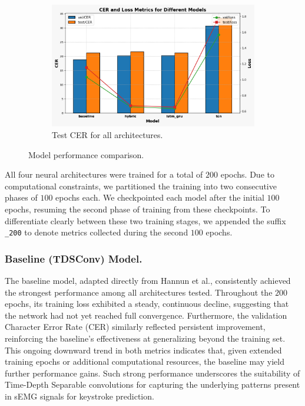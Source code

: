 \begin{figure}
\begin{subfigure}[b]{0.3\textwidth}
        \includegraphics[width=\textwidth]{figures/test.png}
        \caption{Test CER for all architectures.}
    \end{subfigure}
    \caption{Model performance comparison.}
    \label{fig:result}
\end{figure}

All four neural architectures were trained for a total of $200$ epochs. Due to computational constraints, we partitioned the training into two consecutive phases of $100$ epochs each. We checkpointed each model after the initial $100$ epochs, resuming the second phase of training from these checkpoints. To differentiate clearly between these two training stages, we appended the suffix \texttt{\_200} to denote metrics collected during the second $100$ epochs.

\subsubsection{Baseline (TDSConv) Model.}

The baseline model, adapted directly from Hannun et al., consistently achieved the strongest performance among all architectures tested. Throughout the $200$ epochs, its training loss exhibited a steady, continuous decline, suggesting that the network had not yet reached full convergence. Furthermore, the validation Character Error Rate (CER) similarly reflected persistent improvement, reinforcing the baseline’s effectiveness at generalizing beyond the training set. This ongoing downward trend in both metrics indicates that, given extended training epochs or additional computational resources, the baseline may yield further performance gains. Such strong performance underscores the suitability of Time-Depth Separable convolutions for capturing the underlying patterns present in sEMG signals for keystroke prediction.

